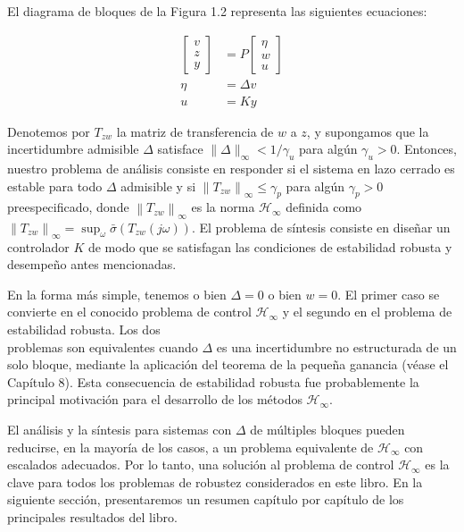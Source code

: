 El diagrama de bloques de la Figura 1.2 representa las siguientes ecuaciones:

$$
\begin{aligned}
{\left[\begin{array}{l}
v \\
z \\
y
\end{array}\right] } & =P\left[\begin{array}{l}
\eta \\
w \\
u
\end{array}\right] \\
\eta & =\Delta v \\
u & =K y
\end{aligned}
$$

Denotemos por $T_{z w}$ la matriz de transferencia de $w$ a $z$, y supongamos que la incertidumbre admisible $\Delta$ satisface $\|\Delta\|_{\infty}<1 / \gamma_{u}$ para algún $\gamma_{u}>0$. Entonces, nuestro problema de análisis consiste en responder si el sistema en lazo cerrado es estable para todo $\Delta$ admisible y si $\left\|T_{z w}\right\|_{\infty} \leq \gamma_{p}$ para algún $\gamma_{p}>0$ preespecificado, donde $\left\|T_{z w}\right\|_{\infty}$ es la norma $\mathcal{H}_{\infty}$ definida como $\left\|T_{z w}\right\|_{\infty}=\sup _{\omega} \bar{\sigma}\left(T_{z w}(j \omega)\right)$. El problema de síntesis consiste en diseñar un controlador $K$ de modo que se satisfagan las condiciones de estabilidad robusta y desempeño antes mencionadas.

En la forma más simple, tenemos o bien $\Delta=0$ o bien $w=0$. El primer caso se convierte en el conocido problema de control $\mathcal{H}_{\infty}$ y el segundo en el problema de estabilidad robusta. Los dos\\
problemas son equivalentes cuando $\Delta$ es una incertidumbre no estructurada de un solo bloque, mediante la aplicación del teorema de la pequeña ganancia (véase el Capítulo 8). Esta consecuencia de estabilidad robusta fue probablemente la principal motivación para el desarrollo de los métodos $\mathcal{H}_{\infty}$.

El análisis y la síntesis para sistemas con $\Delta$ de múltiples bloques pueden reducirse, en la mayoría de los casos, a un problema equivalente de $\mathcal{H}_{\infty}$ con escalados adecuados. Por lo tanto, una solución al problema de control $\mathcal{H}_{\infty}$ es la clave para todos los problemas de robustez considerados en este libro. En la siguiente sección, presentaremos un resumen capítulo por capítulo de los principales resultados del libro.

